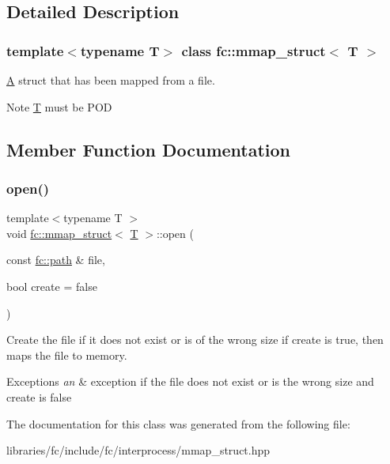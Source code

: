 \subsection{Detailed Description}
\subsubsection*{template$<$typename T$>$\newline
class fc\+::mmap\+\_\+struct$<$ T $>$}

\mbox{\hyperlink{struct_a}{A}} struct that has been mapped from a file. 

\begin{DoxyNote}{Note}
\mbox{\hyperlink{struct_t}{T}} must be P\+OD 
\end{DoxyNote}


\subsection{Member Function Documentation}
\mbox{\label{classfc_1_1mmap__struct_acce9015a433bd1366d2eba95c4e53ab2}} 
\subsubsection{\texorpdfstring{open()}{open()}}
{\footnotesize\ttfamily template$<$typename T $>$ \\
void \mbox{\hyperlink{classfc_1_1mmap__struct}{fc\+::mmap\+\_\+struct}}$<$ \mbox{\hyperlink{struct_t}{T}} $>$\+::open (\begin{DoxyParamCaption}\item[{const \mbox{\hyperlink{classfc_1_1path}{fc\+::path}} \&}]{file,  }\item[{bool}]{create = {\ttfamily false} }\end{DoxyParamCaption})\hspace{0.3cm}{\ttfamily [inline]}}

Create the file if it does not exist or is of the wrong size if create is true, then maps the file to memory.


\begin{DoxyExceptions}{Exceptions}
{\em an} & exception if the file does not exist or is the wrong size and create is false \\
\hline
\end{DoxyExceptions}


The documentation for this class was generated from the following file\+:\begin{DoxyCompactItemize}
\item 
libraries/fc/include/fc/interprocess/mmap\+\_\+struct.\+hpp\end{DoxyCompactItemize}
